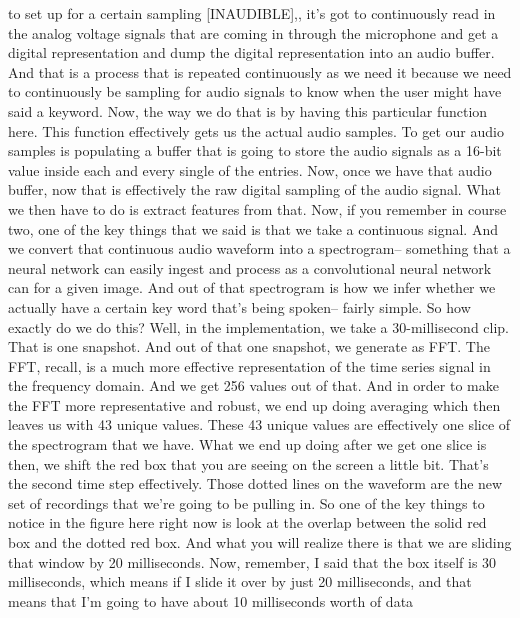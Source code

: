     to set up for a certain sampling [INAUDIBLE],,
    it's got to continuously read in the analog voltage signals that
    are coming in through the microphone and get a digital representation
    and dump the digital representation into an audio buffer.
    And that is a process that is repeated continuously
    as we need it because we need to continuously
    be sampling for audio signals to know when
    the user might have said a keyword.
    Now, the way we do that is by having this particular function here.
    This function effectively gets us the actual audio samples.
    To get our audio samples is populating a buffer
    that is going to store the audio signals as a 16-bit value inside each and every
    single of the entries.
    Now, once we have that audio buffer, now that
    is effectively the raw digital sampling of the audio signal.
    What we then have to do is extract features from that.
    Now, if you remember in course two, one of the key things that we said
    is that we take a continuous signal.
    And we convert that continuous audio waveform into a spectrogram-- something
    that a neural network can easily ingest and process
    as a convolutional neural network can for a given image.
    And out of that spectrogram is how we infer
    whether we actually have a certain key word that's being spoken--
    fairly simple.
    So how exactly do we do this?
    Well, in the implementation, we take a 30-millisecond clip.
    That is one snapshot.
    And out of that one snapshot, we generate as FFT.
    The FFT, recall, is a much more effective representation
    of the time series signal in the frequency domain.
    And we get 256 values out of that.
    And in order to make the FFT more representative and robust,
    we end up doing averaging which then leaves us with 43 unique values.
    These 43 unique values are effectively one slice of the spectrogram
    that we have.
    What we end up doing after we get one slice is then,
    we shift the red box that you are seeing on the screen a little bit.
    That's the second time step effectively.
    Those dotted lines on the waveform are the new set of recordings
    that we're going to be pulling in.
    So one of the key things to notice in the figure here right now
    is look at the overlap between the solid red box and the dotted red box.
    And what you will realize there is that we are
    sliding that window by 20 milliseconds.
    Now, remember, I said that the box itself
    is 30 milliseconds, which means if I slide it over by just 20 milliseconds,
    and that means that I'm going to have about 10 milliseconds worth of data

